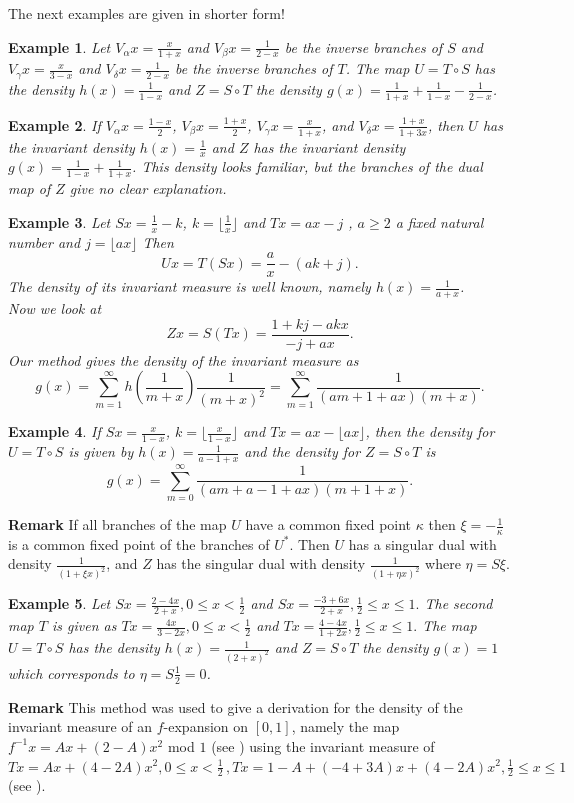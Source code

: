 \documentclass[12pt]{article}
\newtheorem{example}{Example}
\begin{document}
The next examples are given in shorter form!
\begin{example}
Let $V_{\alpha} x = \frac{x}{1+x}$ and  $V_{\beta} x = \frac{1}{2-x}$ be the inverse branches of $S$ and  $V_{\gamma} x = \frac{x}{3-x}$ and $V_{\delta} x = \frac{1}{2-x}$ be the inverse branches of $T$. The map $U = T \circ S $ has the density $h(x) = \frac{1}{1-x}$ and $Z= S \circ T$ the density $g(x)= \frac{1}{1+x} + \frac{1}{1-x} - \frac{1}{2-x}$.
\end{example}
\begin{example}
If $V_{\alpha} x = \frac{1-x}{2}$, $V_{\beta} x = \frac{1+x}{2}$, $V_{\gamma} x = \frac{x}{1+x}$,	 and $V_{\delta} x = \frac{1+x}{1+3x}$, then $U$ has the invariant density $h(x)= \frac{1}{x}$ and $Z$ has the invariant density $g(x)= \frac{1}{1-x} +  \frac{1}{1+x}$. This density looks familiar, but the branches of the dual map of $Z$ give no clear  explanation.  
\end{example}
\begin{example}
	Let $Sx = \frac{1}{x} -k$, $ k= \lfloor \frac{1}{x} \rfloor$ and $Tx = a x - j$ , $a \geq 2$ a fixed natural number and $j = \lfloor ax \rfloor$ Then 
	$$U x =T(Sx) = \frac{a}{x} -(ak + j).$$ 
	The density of its invariant measure is well known, namely $h(x)= \frac{1}{a+x}$. \\
	Now we look at $$Zx = S(Tx) = \frac{1+kj - akx}{-j +ax}.$$ Our method gives the density of the invariant measure as
	$$ g(x)= \sum_{m=1}^{\infty}h(\frac{1}{m+x})\frac{1}{(m+x)^2} = \sum_{m=1}^{\infty}\frac{1}{(am+1+ax)(m+x)}.$$
	\end{example}
\begin{example}
	If $Sx = \frac{x}{1-x}$, $k= \lfloor \frac{x}{1-x} \rfloor$ and $Tx = ax- \lfloor ax \rfloor $, then the density for $U =T\circ S$ is given by $h(x)= \frac{1}{a-1+x}$ and the density for $Z = S \circ T$ is 
	$$g(x)= \sum_{m=0}^{\infty} \frac{1}{(am + a-1 +ax)(m+1+x)}.$$
\end{example}
{\bf Remark} If all  branches of the map $U$ have a common fixed point $\kappa$ then $\xi= - \frac{1}{\kappa}$ is a common fixed point of the branches of $U^{*}$. Then $U$ has a singular dual with density $\frac{1}{(1+ \xi x)^2}$, and $Z$ has the singular dual with density $\frac{1}{(1+ \eta x)^2}$ where $ \eta = S \xi$. 
\begin{example}
Let $Sx = \frac{2-4x}{2+x}, 0 \leq x < \frac{1}{2}$ and $Sx = \frac{-3 +6x}{2+x}, \frac{1}{2} \leq x \leq 1.$ The second map $T$ is given as
$Tx = \frac{4x}{3-2x}, 0 \leq x < \frac{1}{2}$ and $Tx = \frac{4 -4x}{1+2x} , \frac{1}{2} \leq x \leq 1.$ The map $U = T \circ S $ has the density $h(x) = \frac{1}{(2+x)^2}$ and $Z= S \circ T$ the density $g(x)= 1$ which corresponds to $\eta = S \frac{1}{2} = 0$.
\end{example}
 {\bf Remark} This method was used to give a derivation for the density of the invariant measure of an $f$-expansion on $[0,1]$, namely the map $f^{-1}x = Ax + (2-A)x^2$ mod ${1}$ (see \cite {Th}) using the invariant measure of $Tx = Ax + (4-2A)x^2, 0 \leq x < \frac{1}{2} \, , Tx = 1-A + (-4+3A)x + (4-2A)x^2, \frac{1}{2} \leq x \leq 1$ (see \cite {Sch18a}).
\end{document}
